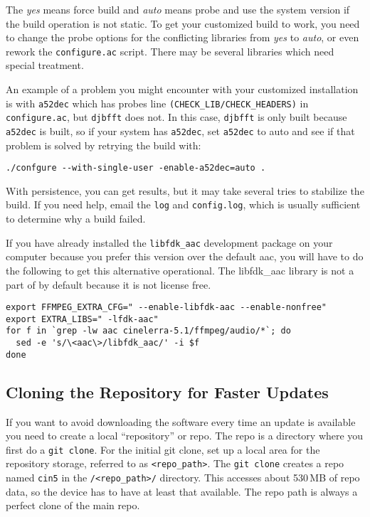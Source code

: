 The \textit{yes} means force build and \textit{auto} means probe and
use the system version if the build operation is not static.  To get
your customized build to work, you need to change the probe options
for the conflicting libraries from \textit{yes} to \textit{auto}, or
even rework the \texttt{configure.ac} script.  There may be several
libraries which need special treatment.

An example of a problem you might encounter with your customized
installation is with \texttt{a52dec} which has probes line
\texttt{(CHECK\_LIB/CHECK\_HEADERS)} in \texttt{configure.ac}, but
\texttt{djbfft} does not.  In this case, \texttt{djbfft} is only
built because \texttt{a52dec} is built, so if your system has
\texttt{a52dec}, set \texttt{a52dec} to auto and see if that
problem is solved by retrying the build with:
\begin{lstlisting}[style=sh]
./confgure --with-single-user -enable-a52dec=auto .
\end{lstlisting}

With persistence, you can get results, but it may take several tries
to stabilize the build.  If you need help, email the \texttt{log}
and \texttt{config.log}, which is usually sufficient to determine
why a build failed.

If you have already installed the \texttt{libfdk\_aac} development
package on your computer because you prefer this version over the
default aac, you will have to do the following to get this
alternative operational. The libfdk\_aac library is not a part of
\CGG{} by default because it is not license free.

\begin{lstlisting}[style=sh]
export FFMPEG_EXTRA_CFG=" --enable-libfdk-aac --enable-nonfree"
export EXTRA_LIBS=" -lfdk-aac"
for f in `grep -lw aac cinelerra-5.1/ffmpeg/audio/*`; do
  sed -e 's/\<aac\>/libfdk_aac/' -i $f
done
\end{lstlisting}


\subsection{Cloning the Repository for Faster Updates}%
\label{sub:cloning_the_repository_for_faster_updates}

If you want to avoid downloading the software every time an update
is available you need to create a local ``repository'' or repo.  The
repo is a directory where you first do a \texttt{git clone}.  For
the initial git clone, set up a local area for the repository
storage, referred to as \texttt{<repo\_path>}.  The \texttt{git
  clone} creates a repo named \texttt{cin5} in the
\texttt{/<repo\_path>/} directory.  This accesses about 530\,MB of
repo data, so the device has to have at least that available.  The
repo path is always a perfect clone of the main repo.


